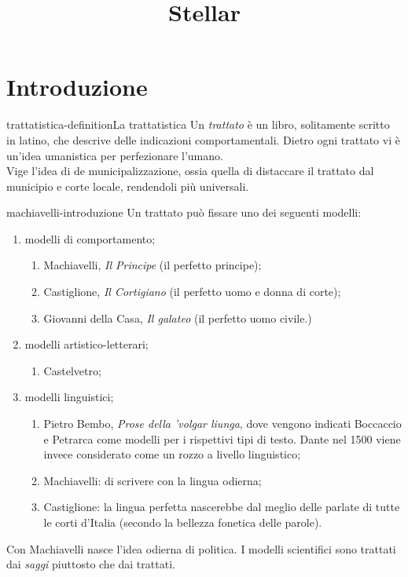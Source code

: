 \documentclass[preview]{standalone}
\begin{document}
\title{Stellar}
\genpage

\section{Introduzione}

\begin{snippetdefinition}{trattatistica-definition}{La trattatistica}
    Un \textit{trattato} è un libro, solitamente scritto in latino,
    che descrive delle indicazioni comportamentali.
    Dietro ogni trattato vi è un'idea umanistica per perfezionare l'umano. \\
    Vige l'idea di de municipalizzazione, ossia quella di distaccare
    il trattato dal municipio e corte locale, rendendoli più universali.
\end{snippetdefinition}

\begin{snippet}{machiavelli-introduzione}
    Un trattato può fissare uno dei seguenti modelli:
    \begin{enumerate}
        \item modelli di comportamento;
        \begin{enumerate}
            \item Machiavelli, \textit{Il Principe} (il perfetto principe);
            \item Castiglione, \textit{Il Cortigiano} (il perfetto uomo e donna di corte);
            \item Giovanni della Casa, \textit{Il galateo} (il perfetto uomo civile.)
        \end{enumerate}
        \item modelli artistico-letterari;
        \begin{enumerate}
            \item Castelvetro;
        \end{enumerate}
        \item modelli linguistici;
        \begin{enumerate}
            \item Pietro Bembo, \textit{Prose della 'volgar liunga},
                dove vengono indicati Boccaccio e Petrarca come modelli per i rispettivi tipi di testo.
                Dante nel 1500 viene invece considerato come un rozzo a livello linguistico;
            \item Machiavelli: di scrivere con la lingua odierna;
            \item Castiglione: la lingua perfetta nascerebbe dal
                meglio delle parlate di tutte le corti d'Italia (secondo la bellezza fonetica delle parole).
        \end{enumerate}
    \end{enumerate}
    
    Con Machiavelli nasce l'idea odierna di politica.
    I modelli scientifici sono trattati dai \textit{saggi} piuttosto che dai trattati.
\end{snippet}
\end{document}
